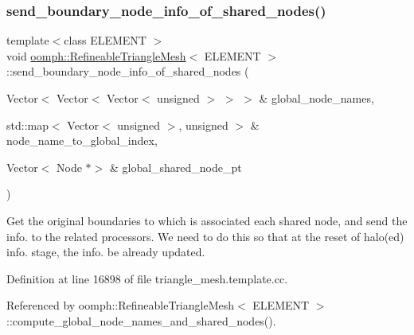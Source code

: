 \subsubsection{\texorpdfstring{send\+\_\+boundary\+\_\+node\+\_\+info\+\_\+of\+\_\+shared\+\_\+nodes()}{send\_boundary\_node\_info\_of\_shared\_nodes()}}
{\footnotesize\ttfamily template$<$class E\+L\+E\+M\+E\+NT $>$ \\
void \hyperlink{classoomph_1_1RefineableTriangleMesh}{oomph\+::\+Refineable\+Triangle\+Mesh}$<$ E\+L\+E\+M\+E\+NT $>$\+::send\+\_\+boundary\+\_\+node\+\_\+info\+\_\+of\+\_\+shared\+\_\+nodes (\begin{DoxyParamCaption}\item[{Vector$<$ Vector$<$ Vector$<$ unsigned $>$ $>$ $>$ \&}]{global\+\_\+node\+\_\+names,  }\item[{std\+::map$<$ Vector$<$ unsigned $>$, unsigned $>$ \&}]{node\+\_\+name\+\_\+to\+\_\+global\+\_\+index,  }\item[{Vector$<$ Node $\ast$$>$ \&}]{global\+\_\+shared\+\_\+node\+\_\+pt }\end{DoxyParamCaption})\hspace{0.3cm}{\ttfamily [protected]}}



Get the original boundaries to which is associated each shared node, and send the info. to the related processors. We need to do this so that at the reset of halo(ed) info. stage, the info. be already updated. 



Definition at line 16898 of file triangle\+\_\+mesh.\+template.\+cc.



Referenced by oomph\+::\+Refineable\+Triangle\+Mesh$<$ E\+L\+E\+M\+E\+N\+T $>$\+::compute\+\_\+global\+\_\+node\+\_\+names\+\_\+and\+\_\+shared\+\_\+nodes().

\mbox{\label{classoomph_1_1RefineableTriangleMesh_a3580283bfa7acd135e294051890c62a4}} 
